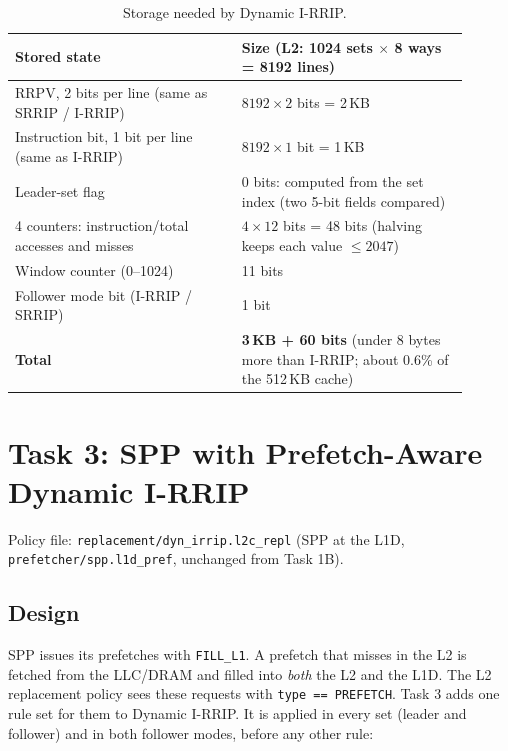 \documentclass[11pt]{article}
\begin{document}
\begin{table}[H]
\centering
\begin{tabular}{p{0.45\linewidth}p{0.45\linewidth}}
\toprule
Stored state & Size (L2: 1024 sets $\times$ 8 ways = 8192 lines)\\
\midrule
RRPV, 2 bits per line (same as SRRIP / I-RRIP) & $8192 \times 2$ bits = 2\,KB\\
Instruction bit, 1 bit per line (same as I-RRIP) & $8192 \times 1$ bit = 1\,KB\\
Leader-set flag & 0 bits: computed from the set index (two 5-bit fields compared)\\
4 counters: instruction/total accesses and misses & $4 \times 12$ bits = 48 bits (halving keeps each value $\le 2047$)\\
Window counter (0--1024) & 11 bits\\
Follower mode bit (I-RRIP / SRRIP) & 1 bit\\
\midrule
\textbf{Total} & \textbf{3\,KB + 60 bits} (under 8 bytes more than I-RRIP; about 0.6\% of the 512\,KB cache)\\
\bottomrule
\end{tabular}
\caption{Storage needed by Dynamic I-RRIP.}
\label{tab:t2b-storage}
\end{table}

\section{Task 3: SPP with Prefetch-Aware Dynamic I-RRIP}

Policy file: \texttt{replacement/dyn\_irrip.l2c\_repl} (SPP at the L1D,
\texttt{prefetcher/spp.l1d\_pref}, unchanged from Task 1B).

\subsection{Design}
SPP issues its prefetches with \texttt{FILL\_L1}. A prefetch that misses in the
L2 is fetched from the LLC/DRAM and filled into \emph{both} the L2 and the L1D.
The L2 replacement policy sees these requests with \texttt{type == PREFETCH}.
Task 3 adds one rule set for them to Dynamic I-RRIP. It is applied in every set
(leader and follower) and in both follower modes, before any other rule:
\end{document}

